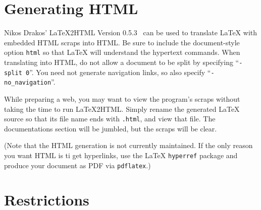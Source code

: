 \documentclass[a4paper]{report}
\begin{document}
\section{Generating HTML}

Nikos Drakos' {\LaTeX}2HTML Version 0.5.3~\cite{drakos:94} can be used
to translate {\LaTeX} with embedded HTML scraps into HTML\@.  Be sure
to include the document-style option \verb|html| so that {\LaTeX} will
understand the hypertext commands.  When translating into HTML, do not
allow a document to be split by specifying ``\verb|-split 0|''.
You need not generate navigation links, so also specify
``\verb|-no_navigation|''.

While preparing a web, you may want to view the program's scraps without
taking the time to run {\LaTeX}2HTML\@.  Simply rename the generated
{\LaTeX} source so that its file name ends with \verb|.html|, and view
that file.  The documentations section will be jumbled, but the
scraps will be clear.

(Note that the HTML generation is not currently maintained. If the
only reason you want HTML is ti get hyperlinks, use the {\LaTeX}
\verb|hyperref| package and produce your document as PDF via
\verb|pdflatex|.)

\section{Restrictions}
\end{document}
